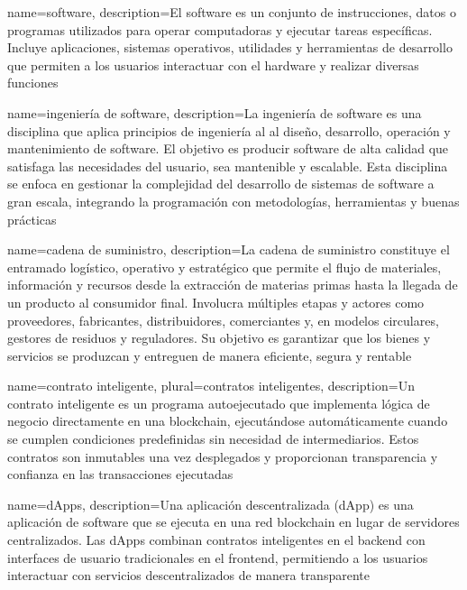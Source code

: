 {
    name=software,
    description={El software es un conjunto de instrucciones, datos o programas utilizados para operar computadoras y ejecutar tareas específicas. Incluye aplicaciones, sistemas operativos, utilidades y herramientas de desarrollo que permiten a los usuarios interactuar con el hardware y realizar diversas funciones}
}


{
    name=ingeniería de software,
    description={La ingeniería de software es una disciplina que aplica principios de ingeniería al al diseño, desarrollo, operación y mantenimiento de software. El objetivo es producir software de alta calidad que satisfaga las necesidades del usuario, sea mantenible y escalable. Esta disciplina se enfoca en gestionar la complejidad del desarrollo de sistemas de software a gran escala, integrando la programación con metodologías, herramientas y buenas prácticas}
}

{
    name=cadena de suministro,
    description={La cadena de suministro constituye el entramado logístico, operativo y estratégico que permite el flujo de materiales, información y recursos desde la extracción de materias primas hasta la llegada de un producto al consumidor final. Involucra múltiples etapas y actores como proveedores, fabricantes, distribuidores, comerciantes y, en modelos circulares, gestores de residuos y reguladores. Su objetivo es garantizar que los bienes y servicios se produzcan y entreguen de manera eficiente, segura y rentable \cite{rodriguez2023modelamiento}}
}

{
    name=contrato inteligente,
    plural=contratos inteligentes,
    description={Un contrato inteligente es un programa autoejecutado que implementa lógica de negocio directamente en una blockchain, ejecutándose automáticamente cuando se cumplen condiciones predefinidas sin necesidad de intermediarios. Estos contratos son inmutables una vez desplegados y proporcionan transparencia y confianza en las transacciones ejecutadas \cite{buterin2013ethereum}}
}

{
    name=dApps,
    description={Una aplicación descentralizada (dApp) es una aplicación de software que se ejecuta en una red blockchain en lugar de servidores centralizados. Las dApps combinan contratos inteligentes en el backend con interfaces de usuario tradicionales en el frontend, permitiendo a los usuarios interactuar con servicios descentralizados de manera transparente}
}


